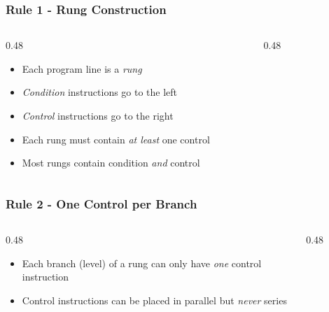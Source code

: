 \begin{frame}
    \frametitle{Rule 1 - Rung Construction}

    \begin{columns}
        \begin{column}{0.48\linewidth}
            \begin{itemize}
                \item Each program line is a \emph{rung}
                \item \emph{Condition} instructions go to the left
                \item \emph{Control} instructions go to the right
                \item Each rung must contain \emph{at least} one control
                \item Most rungs contain condition \emph{and} control
            \end{itemize}
        \end{column}
        \begin{column}{0.48\linewidth}
            \begin{figure}
                \centering
                \resizebox{\linewidth}{!}{
                    
                }
            \end{figure}
        \end{column}
    \end{columns}
\end{frame}

\begin{frame}
    \frametitle{Rule 2 - One Control per Branch}

    \begin{columns}
        \begin{column}{0.48\linewidth}
            \begin{itemize}
                \item Each branch (level) of a rung can only have \emph{one} control instruction
                \item Control instructions can be placed in parallel but \emph{never} series
            \end{itemize}
        \end{column}
        \begin{column}{0.48\linewidth}
            \begin{figure}
                \centering
                \resizebox{\linewidth}{!}{
                    
                }
                \vspace{0.5em}
                
                \resizebox{\linewidth}{!}{
                    
                }
            \end{figure}
        \end{column}
    \end{columns}
\end{frame}

